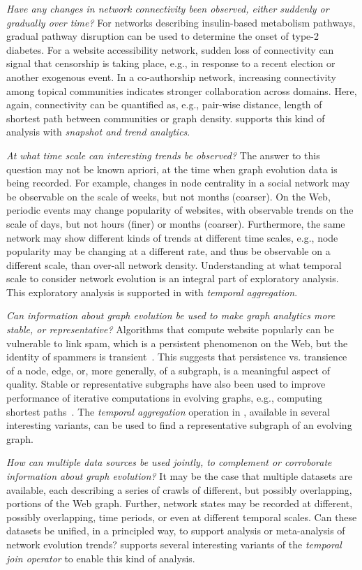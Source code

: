 {\em Have any changes in network connectivity been observed, either
  suddenly or gradually over time?}  For networks describing
insulin-based metabolism pathways, gradual pathway disruption can be
used to determine the onset of type-2 diabetes.  For a website
accessibility network, sudden loss of connectivity can signal that
censorship is taking place, e.g., in response to a recent election or
another exogenous event.  In a co-authorship network, increasing
connectivity among topical communities indicates stronger
collaboration across domains.  Here, again, connectivity can be
quantified as, e.g., pair-wise distance, length of shortest path
between communities or graph density.  \ql supports this kind of
analysis with {\em snapshot and trend analytics}.

{\em At what time scale can interesting trends be observed?} The
answer to this question may not be known apriori, at the time when
graph evolution data is being recorded.  For example, changes in node
centrality in a social network may be observable on the scale of
weeks, but not months (coarser).  On the Web, periodic events may
change popularity of websites, with observable trends on the scale of
days, but not hours (finer) or months (coarser).  Furthermore, the
same network may show different kinds of trends at different time
scales, e.g., node popularity may be changing at a different rate, and
thus be observable on a different scale, than over-all network
density.  Understanding at what temporal scale to consider network
evolution is an integral part of exploratory analysis.  This
exploratory analysis is supported in \ql with {\em temporal
  aggregation}.

{\em Can information about graph evolution be used to make graph
  analytics more stable, or representative?}  Algorithms that compute
website popularly can be vulnerable to link spam, which is a
persistent phenomenon on the Web, but the identity of spammers is
transient~\cite{DBLP:conf/cikm/YangQZGL07}.  This suggests that
persistence vs. transience of a node, edge, or, more generally, of a
subgraph, is a meaningful aspect of quality.  Stable or representative
subgraphs have also been used to improve performance of iterative
computations in evolving graphs, e.g., computing shortest
paths~\cite{Ren2011}.  The {\em temporal aggregation} operation in
\ql, available in several interesting variants, can be used to find a
representative subgraph of an evolving graph.

{\em How can multiple data sources be used jointly, to complement or
  corroborate information about graph evolution?}  It may be the case
that multiple datasets are available, each describing a series of
crawls of different, but possibly overlapping, portions of the Web
graph.  Further, network states may be recorded at different, possibly
overlapping, time periods, or even at different temporal scales.  Can
these datasets be unified, in a principled way, to support analysis or
meta-analysis of network evolution trends?  \ql supports several
interesting variants of the {\em temporal join operator} to enable
this kind of analysis.

